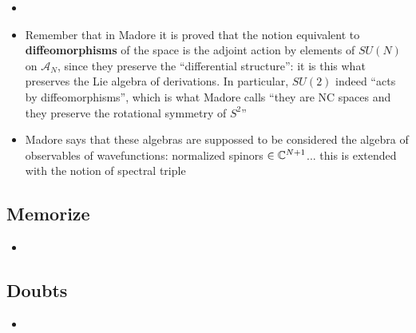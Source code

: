 \documentclass{article}
\begin{document}
\begin{itemize}
\begin{itemize}
        \end{itemize}
    
    \item {}
    
    \item Remember that in Madore it is proved that the notion equivalent to \textbf{diffeomorphisms} of the space is the adjoint action by elements of $SU(N)$ on $\mathcal A_N$, since they preserve the ``differential structure'': it is this what preserves the Lie algebra of derivations. In particular, $SU(2)$ indeed ``acts by diffeomorphisms'', which is what Madore calls ``they are NC spaces and they preserve the rotational symmetry of $S^2$''
    
    \item Madore says that these algebras are suppossed to be considered the algebra of observables of wavefunctions: normalized spinors $\in \mathbb{C}^{N+1}$... this is extended with the notion of spectral triple
    
    \end{itemize}

\subsection{Memorize}

    \begin{itemize}

    \item 
    
    \end{itemize}

\subsection{Doubts}

    \begin{itemize}

    \item 
    
    \end{itemize}

\end{document}
